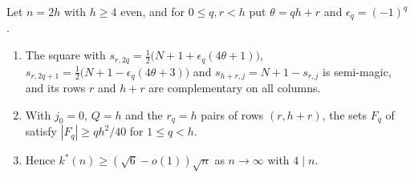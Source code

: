 \begin{proposition}
\label{prop:subset}
Let $n=2h$ with $h\ge4$ even, and for $0\le q,r<h$ put $\theta=qh+r$ and $\epsilon_q=(-1)^q$.
\begin{enumerate}
\item[(i)] The square with $s_{r,2q}=\frac12\bigl(N+1+\epsilon_q(4\theta+1)\bigr)$, $s_{r,2q+1}=\frac12\bigl(N+1-\epsilon_q(4\theta+3)\bigr)$ and $s_{h+r,j}=N+1-s_{r,j}$ is semi-magic, and its rows $r$ and $h+r$ are complementary on all columns.
\item[(ii)] With $j_0=0$, $Q=h$ and the $r_q=h$ pairs of rows $(r,h+r)$, the sets $F_q$ of  satisfy $|F_q|\ge qh^2/40$ for $1\le q<h$.
\item[(iii)] Hence $k^*(n)\ge(\sqrt6-o(1))\sqrt n$ as $n\to\infty$ with $4\mid n$.
\end{enumerate}
\end{proposition}

